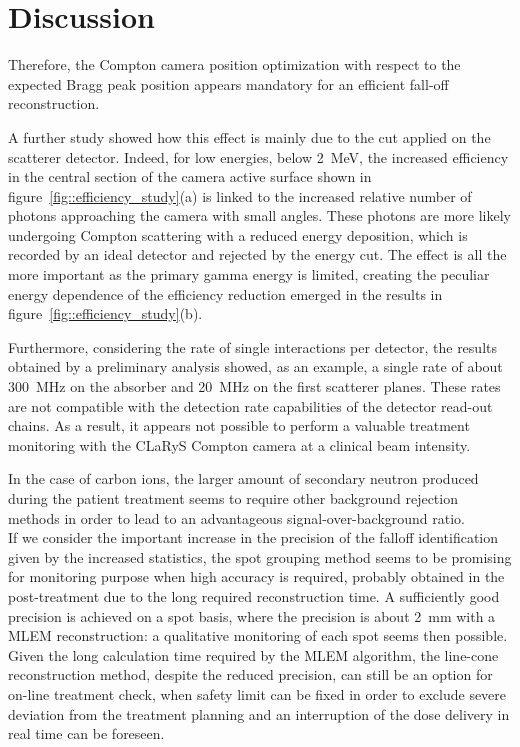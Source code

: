 \section{Discussion}



Therefore, the Compton camera position optimization with respect to the expected Bragg peak position appears mandatory for an efficient fall-off reconstruction.\newline

A further study showed how this effect is mainly due to the cut applied on the scatterer detector. Indeed, for low energies, below 2~MeV, the increased efficiency in the central section of the camera active surface shown in figure~\ref{fig::efficiency_study}(a) is linked to the increased relative number of photons approaching the camera with small angles. These photons are more likely undergoing Compton scattering with a reduced energy deposition, which is recorded by an ideal detector and rejected by the energy cut. The effect is all the more important as the primary gamma energy is limited, creating the peculiar energy dependence of the efficiency reduction emerged in the results in figure~\ref{fig::efficiency_study}(b).
 
Furthermore, considering the rate of single interactions per detector, the results obtained by a preliminary analysis showed, as an example, a single rate of about 300~MHz on the absorber and 20~MHz on the first scatterer planes. These rates are not compatible with the detection rate capabilities of the detector read-out chains. As a result, it appears not possible to perform a valuable treatment monitoring with the CLaRyS Compton camera at a clinical beam intensity.\newline

In the case of carbon ions, the larger amount of secondary neutron produced during the patient treatment seems to require other background rejection methods in order to lead to an advantageous signal-over-background ratio.\\

If we consider the important increase in the precision of the falloff identification given by the increased statistics, the spot grouping method seems to be promising for monitoring purpose when high accuracy is required, probably obtained in the post-treatment due to the long required reconstruction time. A sufficiently good precision is achieved on a spot basis, where the precision is about 2~mm with a MLEM reconstruction: a qualitative monitoring of each spot seems then possible. Given the long calculation time required by the MLEM algorithm, the line-cone reconstruction method, despite the reduced precision, can still be an option for on-line treatment check, when safety limit can be fixed in order to exclude severe deviation from the treatment planning and an interruption of the dose delivery in real time can be foreseen.          


